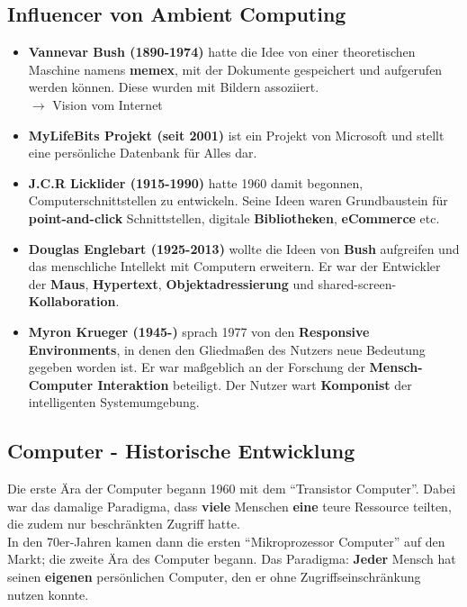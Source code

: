 \documentclass[a4paper]{article}
\begin{document}
\subsection{Influencer von Ambient Computing}
\begin{itemize}
	\item \textbf{Vannevar Bush (1890-1974)} hatte die Idee von einer theoretischen Maschine namens \textbf{memex}, mit der Dokumente gespeichert und aufgerufen werden können. Diese wurden mit Bildern assoziiert. \\
	$\rightarrow$ Vision vom Internet
	\item \textbf{MyLifeBits Projekt (seit 2001)} ist ein Projekt von Microsoft und stellt eine persönliche Datenbank für Alles dar.
	\item \textbf{J.C.R Licklider (1915-1990)} hatte 1960 damit begonnen, Computerschnittstellen zu entwickeln. Seine Ideen waren Grundbaustein für \textbf{point-and-click} Schnittstellen, digitale \textbf{Bibliotheken}, \textbf{eCommerce} etc.
	\item \textbf{Douglas Englebart (1925-2013)} wollte die Ideen von \textbf{Bush} aufgreifen und das menschliche Intellekt mit Computern erweitern. Er war der Entwickler der \textbf{Maus}, \textbf{Hypertext}, \textbf{Objektadressierung} und shared-screen-\textbf{Kollaboration}.
	\item \textbf{Myron Krueger (1945-)} sprach 1977 von den \textbf{Responsive Environments}, in denen den Gliedmaßen des Nutzers neue Bedeutung gegeben worden ist. Er war maßgeblich an der Forschung der \textbf{Mensch-Computer Interaktion} beteiligt. Der Nutzer wart \textbf{Komponist} der intelligenten Systemumgebung. 
\end{itemize}

\subsection{Computer - Historische Entwicklung}
Die erste Ära der Computer begann 1960 mit dem ``Transistor Computer''. Dabei war das damalige Paradigma, dass \textbf{viele} Menschen \textbf{eine} teure Ressource teilten, die zudem nur beschränkten Zugriff hatte.\\

In den 70er-Jahren kamen dann die ersten ``Mikroprozessor Computer'' auf den Markt; die zweite Ära des Computer begann. Das Paradigma: \textbf{Jeder} Mensch hat seinen \textbf{eigenen} persönlichen Computer, den er ohne Zugriffseinschränkung nutzen konnte.\\
\end{document}
